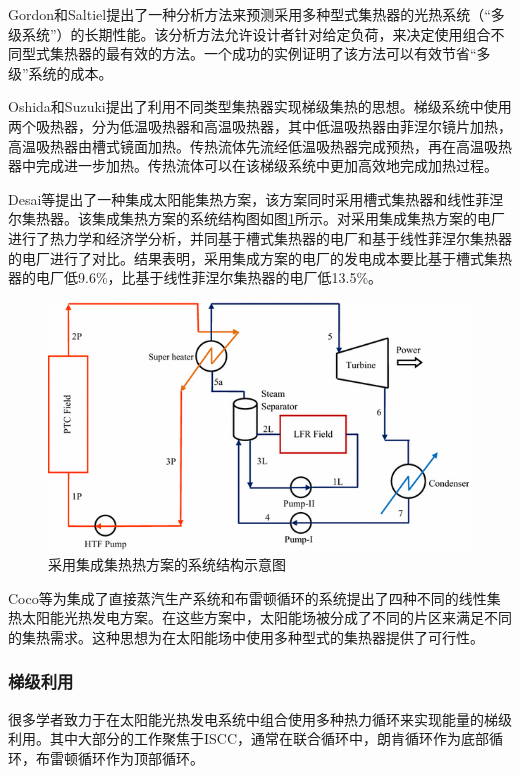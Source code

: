 Gordon和Saltiel提出了一种分析方法来预测采用多种型式集热器的光热系统（“多级系统”）的长期性能。该分析方法允许设计者针对给定负荷，来决定使用组合不同型式集热器的最有效的方法。一个成功的实例证明了该方法可以有效节省“多级”系统的成本。

Oshida和Suzuki\cite{Oshida1987}提出了利用不同类型集热器实现梯级集热的思想。梯级系统中使用两个吸热器，分为低温吸热器和高温吸热器，其中低温吸热器由菲涅尔镜片加热，高温吸热器由槽式镜面加热。传热流体先流经低温吸热器完成预热，再在高温吸热器中完成进一步加热。传热流体可以在该梯级系统中更加高效地完成加热过程。

Desai等\cite{Desai2015}提出了一种集成太阳能集热方案，该方案同时采用槽式集热器和线性菲涅尔集热器。该集成集热方案的系统结构图如图\ref{fig:Desai2015}所示。对采用集成集热方案的电厂进行了热力学和经济学分析，并同基于槽式集热器的电厂和基于线性菲涅尔集热器的电厂进行了对比。结果表明，采用集成方案的电厂的发电成本要比基于槽式集热器的电厂低9.6\%，比基于线性菲涅尔集热器的电厂低13.5\%。

\begin{figure}[!ht]
\centering
\includegraphics[width=.7\textwidth]{fig/Desai2015.jpg}
\caption{采用集成集热热方案的系统结构示意图}\label{fig:Desai2015}
\end{figure}

Coco等\cite{Coco2015}为集成了直接蒸汽生产系统和布雷顿循环的系统提出了四种不同的线性集热太阳能光热发电方案。在这些方案中，太阳能场被分成了不同的片区来满足不同的集热需求。这种思想为在太阳能场中使用多种型式的集热器提供了可行性。


\subsubsection{梯级利用}

很多学者致力于在太阳能光热发电系统中组合使用多种热力循环来实现能量的梯级利用。其中大部分的工作聚焦于ISCC，通常在联合循环中，朗肯循环作为底部循环，布雷顿循环作为顶部循环。

